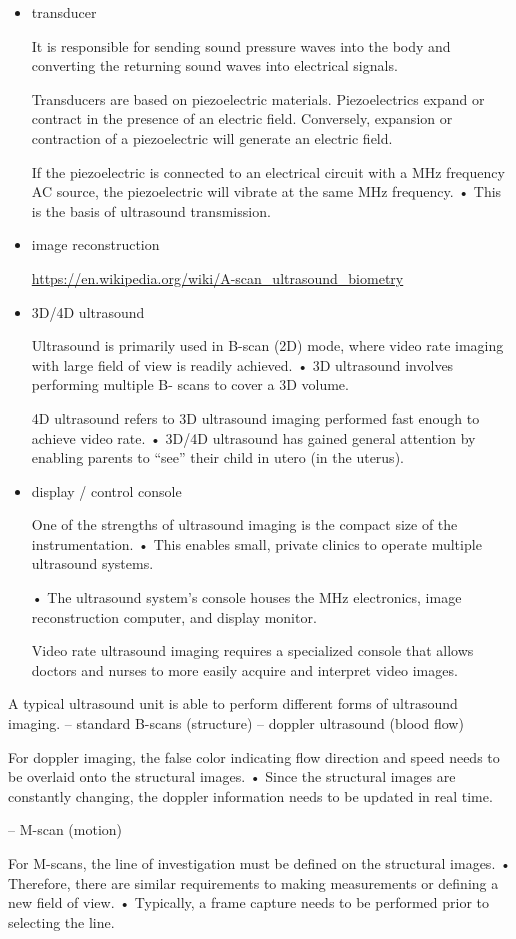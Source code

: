 \documentclass[UTF8,a4paper,11pt]{book}
\theoremstyle{mystyle}{
  \newtheorem{example}{Example}
}
\begin{document}
\begin{itemize}
\item transducer

It is responsible for sending sound pressure
waves into the body and converting the
returning sound waves into electrical signals.

Transducers are based on piezoelectric
materials.
 Piezoelectrics expand or contract in the
presence of an electric field.
 Conversely, expansion or contraction of a
piezoelectric will generate an electric field.

 If the piezoelectric is connected to an
electrical circuit with a MHz frequency AC
source, the piezoelectric will vibrate at the
same MHz frequency.
• This is the basis of ultrasound transmission.



\item image reconstruction

\url{https://en.wikipedia.org/wiki/A-scan_ultrasound_biometry}

\item 3D/4D ultrasound

Ultrasound is primarily used in B-scan (2D)
mode, where video rate imaging with large
field of view is readily achieved.
• 3D ultrasound involves performing multiple B-
scans to cover a 3D volume.

 4D ultrasound refers to 3D ultrasound imaging
performed fast enough to achieve video rate.
• 3D/4D ultrasound has gained general
attention by enabling parents to “see” their
child in utero (in the uterus).


\item display / control console

One of the strengths of ultrasound
imaging is the compact size of the
instrumentation.
• This enables small, private clinics
to operate multiple ultrasound
systems.

• The ultrasound system’s console
houses the MHz electronics,
image reconstruction computer,
and display monitor.

Video rate ultrasound imaging requires a
specialized console that allows doctors and
nurses to more easily acquire and interpret
video images.


\end{itemize}


A typical ultrasound unit is able to perform
different forms of ultrasound imaging.
– standard B-scans (structure)
– doppler ultrasound (blood flow)

For doppler imaging, the false color indicating
flow direction and speed needs to be overlaid
onto the structural images.
• Since the structural images are constantly
changing, the doppler information needs to be
updated in real time.

– M-scan (motion)

For M-scans, the line of investigation must be
defined on the structural images.
• Therefore, there are similar requirements to
making measurements or defining a new field
of view.
• Typically, a frame capture needs to be
performed prior to selecting the line.
\end{document}
